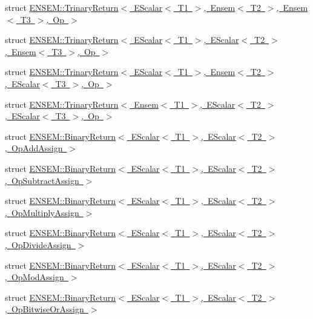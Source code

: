 \begin{DoxyCompactItemize}
\item 
struct \mbox{\hyperlink{structENSEM_1_1TrinaryReturn_3_01EScalar_3_01T1_01_4_00_01Ensem_3_01T2_01_4_00_01Ensem_3_01T3_01_4_00_01Op_01_4}{E\+N\+S\+E\+M\+::\+Trinary\+Return$<$ E\+Scalar$<$ T1 $>$, Ensem$<$ T2 $>$, Ensem$<$ T3 $>$, Op $>$}}
\item 
struct \mbox{\hyperlink{structENSEM_1_1TrinaryReturn_3_01EScalar_3_01T1_01_4_00_01EScalar_3_01T2_01_4_00_01Ensem_3_01T3_01_4_00_01Op_01_4}{E\+N\+S\+E\+M\+::\+Trinary\+Return$<$ E\+Scalar$<$ T1 $>$, E\+Scalar$<$ T2 $>$, Ensem$<$ T3 $>$, Op $>$}}
\item 
struct \mbox{\hyperlink{structENSEM_1_1TrinaryReturn_3_01EScalar_3_01T1_01_4_00_01Ensem_3_01T2_01_4_00_01EScalar_3_01T3_01_4_00_01Op_01_4}{E\+N\+S\+E\+M\+::\+Trinary\+Return$<$ E\+Scalar$<$ T1 $>$, Ensem$<$ T2 $>$, E\+Scalar$<$ T3 $>$, Op $>$}}
\item 
struct \mbox{\hyperlink{structENSEM_1_1TrinaryReturn_3_01Ensem_3_01T1_01_4_00_01EScalar_3_01T2_01_4_00_01EScalar_3_01T3_01_4_00_01Op_01_4}{E\+N\+S\+E\+M\+::\+Trinary\+Return$<$ Ensem$<$ T1 $>$, E\+Scalar$<$ T2 $>$, E\+Scalar$<$ T3 $>$, Op $>$}}
\item 
struct \mbox{\hyperlink{structENSEM_1_1BinaryReturn_3_01EScalar_3_01T1_01_4_00_01EScalar_3_01T2_01_4_00_01OpAddAssign_01_4}{E\+N\+S\+E\+M\+::\+Binary\+Return$<$ E\+Scalar$<$ T1 $>$, E\+Scalar$<$ T2 $>$, Op\+Add\+Assign $>$}}
\item 
struct \mbox{\hyperlink{structENSEM_1_1BinaryReturn_3_01EScalar_3_01T1_01_4_00_01EScalar_3_01T2_01_4_00_01OpSubtractAssign_01_4}{E\+N\+S\+E\+M\+::\+Binary\+Return$<$ E\+Scalar$<$ T1 $>$, E\+Scalar$<$ T2 $>$, Op\+Subtract\+Assign $>$}}
\item 
struct \mbox{\hyperlink{structENSEM_1_1BinaryReturn_3_01EScalar_3_01T1_01_4_00_01EScalar_3_01T2_01_4_00_01OpMultiplyAssign_01_4}{E\+N\+S\+E\+M\+::\+Binary\+Return$<$ E\+Scalar$<$ T1 $>$, E\+Scalar$<$ T2 $>$, Op\+Multiply\+Assign $>$}}
\item 
struct \mbox{\hyperlink{structENSEM_1_1BinaryReturn_3_01EScalar_3_01T1_01_4_00_01EScalar_3_01T2_01_4_00_01OpDivideAssign_01_4}{E\+N\+S\+E\+M\+::\+Binary\+Return$<$ E\+Scalar$<$ T1 $>$, E\+Scalar$<$ T2 $>$, Op\+Divide\+Assign $>$}}
\item 
struct \mbox{\hyperlink{structENSEM_1_1BinaryReturn_3_01EScalar_3_01T1_01_4_00_01EScalar_3_01T2_01_4_00_01OpModAssign_01_4}{E\+N\+S\+E\+M\+::\+Binary\+Return$<$ E\+Scalar$<$ T1 $>$, E\+Scalar$<$ T2 $>$, Op\+Mod\+Assign $>$}}
\item 
struct \mbox{\hyperlink{structENSEM_1_1BinaryReturn_3_01EScalar_3_01T1_01_4_00_01EScalar_3_01T2_01_4_00_01OpBitwiseOrAssign_01_4}{E\+N\+S\+E\+M\+::\+Binary\+Return$<$ E\+Scalar$<$ T1 $>$, E\+Scalar$<$ T2 $>$, Op\+Bitwise\+Or\+Assign $>$}}

\end{DoxyCompactItemize}
